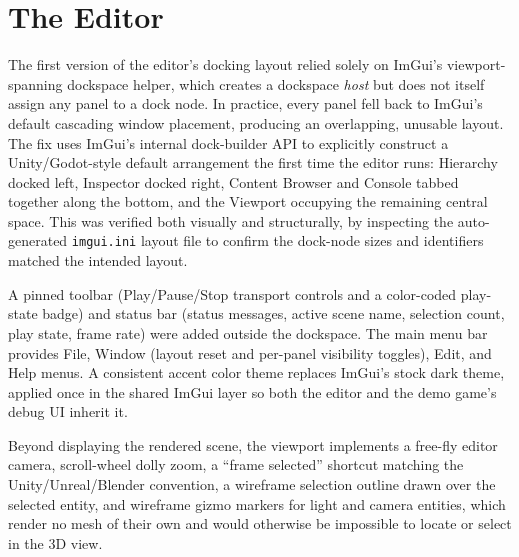 \documentclass[conference]{IEEEtran}
\begin{document}
\section{The Editor}
\label{sec:editor}

The first version of the editor's docking layout relied solely on
ImGui's viewport-spanning dockspace helper, which creates a dockspace
\emph{host} but does not itself assign any panel to a dock node. In
practice, every panel fell back to ImGui's default cascading window
placement, producing an overlapping, unusable layout. The fix uses
ImGui's internal dock-builder API to explicitly construct a Unity/Godot-style
default arrangement the first time the editor runs: Hierarchy docked
left, Inspector docked right, Content Browser and Console tabbed
together along the bottom, and the Viewport occupying the remaining
central space. This was verified both visually and structurally, by
inspecting the auto-generated \texttt{imgui.ini} layout file to confirm
the dock-node sizes and identifiers matched the intended layout.

A pinned toolbar (Play/Pause/Stop transport controls and a color-coded
play-state badge) and status bar (status messages, active scene name,
selection count, play state, frame rate) were added outside the
dockspace. The main menu bar provides File, Window (layout reset and
per-panel visibility toggles), Edit, and Help menus. A consistent accent
color theme replaces ImGui's stock dark theme, applied once in the
shared ImGui layer so both the editor and the demo game's debug UI
inherit it.

Beyond displaying the rendered scene, the viewport implements a
free-fly editor camera, scroll-wheel dolly zoom, a ``frame selected''
shortcut matching the Unity/Unreal/Blender convention, a wireframe
selection outline drawn over the selected entity, and wireframe gizmo
markers for light and camera entities, which render no mesh of their
own and would otherwise be impossible to locate or select in the 3D
view.
\end{document}
